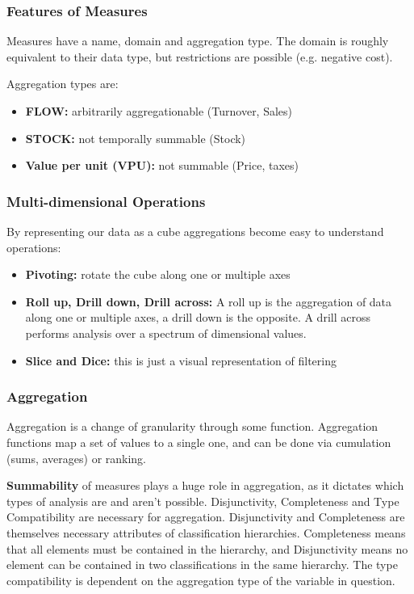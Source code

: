 \documentclass{article}
\begin{document}
\subsubsection{Features of Measures}
Measures have a name, domain and aggregation type.
The domain is roughly equivalent to their data type, but restrictions are possible (e.g. negative cost).

Aggregation types are:
\begin{itemize}
    \item \textbf{FLOW:} arbitrarily aggregationable (Turnover, Sales)
    \item \textbf{STOCK:} not temporally summable (Stock)
    \item \textbf{Value per unit (VPU):} not summable (Price, taxes)
\end{itemize}

\subsubsection{Multi-dimensional Operations}
By representing our data as a cube aggregations become easy to understand operations:
\begin{itemize}
    \item \textbf{Pivoting:} rotate the cube along one or multiple axes
    \item \textbf{Roll up, Drill down, Drill across:} A roll up is the aggregation of data along one or multiple axes, a drill down is the opposite.
        A drill across performs analysis over a spectrum of dimensional values.
    \item \textbf{Slice and Dice:} this is just a visual representation of filtering
\end{itemize}

\subsubsection{Aggregation}
Aggregation is a change of granularity through some function.
Aggregation functions map a set of values to a single one, and can be done via cumulation (sums, averages) or ranking.

\textbf{Summability} of measures plays a huge role in aggregation, as it dictates which types of analysis are and aren't possible.
Disjunctivity, Completeness and Type Compatibility are necessary for aggregation.
Disjunctivity and Completeness are themselves necessary attributes of classification hierarchies.
Completeness means that all elements must be contained in the hierarchy, and Disjunctivity means no element can be contained in two classifications in the same hierarchy.
The type compatibility is dependent on the aggregation type of the variable in question.
\end{document}
